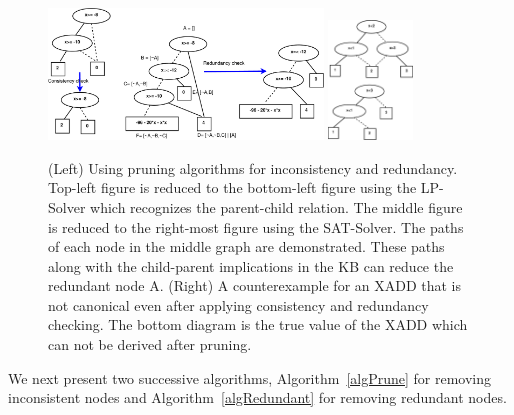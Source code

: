 \documentclass[twoside,11pt]{article}
\begin{document}
\vspace{10mm}
\begin{figure}[t!]
\centering
\includegraphics[width=0.65\textwidth]{Figures1/diagrams/redundancy.pdf}
\hspace{10mm}
\includegraphics[width=0.2\textwidth]{Figures2/diagrams/counterexample.pdf}
\vspace{-2mm}

\caption{\footnotesize (Left) Using pruning algorithms for inconsistency and redundancy. Top-left figure is reduced to the bottom-left figure using the LP-Solver which recognizes the parent-child relation. The middle figure is reduced to the right-most figure using the SAT-Solver. The paths of each node in the middle graph are demonstrated. These paths along with the child-parent implications in the KB can reduce the redundant node A. (Right) A counterexample for an XADD that is not canonical even after applying consistency and redundancy checking. The bottom diagram is the true value of the XADD which can not be derived after pruning.}
\label{fig:canonical}
\vspace{-6mm}
\end{figure}
We next present two successive algorithms, Algorithm~\ref{algPrune} for removing inconsistent nodes and Algorithm~\ref{algRedundant} for removing redundant nodes. 
\end{document}
